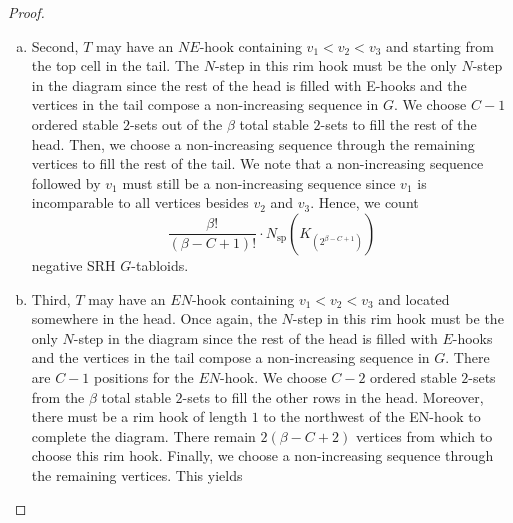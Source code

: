\documentclass[12pt]{amsart}
\numberwithin{equation}{section}
\theoremstyle{plain}
\theoremstyle{definition}
\theoremstyle{remark}
\begin{document}
\begin{proof}
\begin{enumerate}
\begin{enumerate}[(a)]
\begin{enumerate}[(i)]
        
        
        \item Assume one vertex $v_j$ from the stable $3$-set is in the tail. We have three choices for the vertex $v_j$. We then choose $C-1$ ordered stable $2$-sets out of the $\beta$ total stable $2$-sets. Next, we choose a position for the $E$-hook with the other two vertices from the $3$-set, yielding $C$ possible choices. Finally, we choose a non-increasing sequence in $G$ through the remaining vertices. We thus count
        \[
        3\cdot \frac{\beta!}{(\beta-C+1)!}\cdot C \cdot N_{\mathrm{sp}}(K_{(2^{\beta-C+1},1)})
        \]
        positive $SRH$ $G$-tabloids. 
    \end{enumerate}
        \item Second, $T$ may have an $NE$-hook containing $v_1<v_2<v_3$ and starting from the top cell in the tail. The $N$-step in this rim hook must be the only $N$-step in the diagram since the rest of the head is filled with E-hooks and the vertices in the tail compose a non-increasing sequence in $G$. We choose $C-1$ ordered stable $2$-sets out of the $\beta$ total stable $2$-sets to fill the rest of the head. Then, we choose a non-increasing sequence through the remaining vertices to fill the rest of the tail. We note that a non-increasing sequence followed by $v_1$ must still be a non-increasing sequence since $v_1$ is incomparable to all vertices besides $v_2$ and $v_3$. Hence, we count
        \[
        \frac{\beta !}{(\beta-C+1)!}\cdot N_{\mathrm{sp}}(K_{(2^{\beta-C+1})})
        \]
        negative SRH $G$-tabloids.
        \item Third, $T$ may have an $EN$-hook containing $v_1<v_2<v_3$ and located somewhere in the head. Once again, the $N$-step in this rim hook must be the only $N$-step in the diagram since the rest of the head is filled with $E$-hooks and the vertices in the tail compose a non-increasing sequence in $G$. There are $C-1$ positions for the $EN$-hook. We choose $C-2$ ordered stable $2$-sets from the $\beta$ total stable $2$-sets to fill the other rows in the head. Moreover, there must be a rim hook of length $1$ to the northwest of the EN-hook to complete the diagram. There remain $2(\beta-C+2)$ vertices from which to choose this rim hook. Finally, we choose a non-increasing sequence through the remaining vertices. This yields

\end{enumerate}
\end{enumerate}
\end{proof}
\end{document}
